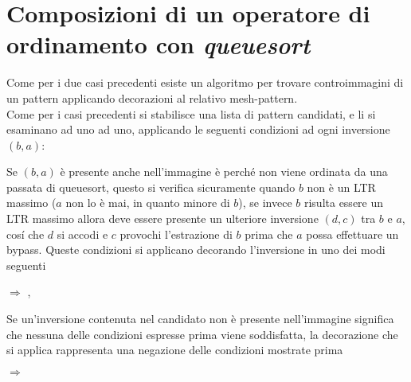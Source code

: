 \section{Composizioni di un operatore di ordinamento con \textit{queuesort}}
Come per i due casi precedenti esiste un algoritmo per trovare controimmagini di un pattern applicando decorazioni al relativo mesh-pattern.\\
Come per i casi precedenti si stabilisce una lista di pattern candidati, e li si esaminano ad uno ad uno, applicando le seguenti condizioni ad ogni inversione $(b,a)$:
\begin{description} 
	\item Se $(b,a)$ \`e presente anche nell'immagine \`e perch\'e non viene ordinata da una passata di queuesort, questo si verifica sicuramente quando $b$ non \`e un LTR massimo ($a$ non lo \`e mai, in quanto minore di $b$), se invece $b$ risulta essere un LTR massimo allora deve essere presente un ulteriore inversione $(d,c)$ tra $b$ e $a$, cos\'i che $d$ si accodi e $c$ provochi l'estrazione di $b$ prima che $a$ possa effettuare un bypass. Queste condizioni si applicano decorando l'inversione in uno dei modi seguenti
	\begin{center}
		 $\Rightarrow$
		,
	\end{center}
	\item Se un'inversione contenuta nel candidato non \`e presente nell'immagine significa che nessuna delle condizioni espresse prima viene soddisfatta, la decorazione che si applica rappresenta una negazione delle condizioni mostrate prima
	\begin{center}
		 $\Rightarrow$
	\end{center}
\end{description}
